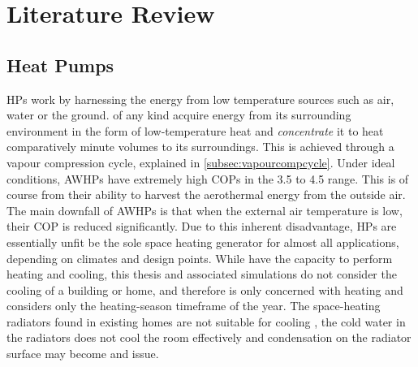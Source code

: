 \chapter{Literature Review}\label{ch:litreview}



\section{Heat Pumps} \label{sec:heatpumps}
\acp{HP} work by harnessing the energy from low temperature sources such as air, water or the ground. \HPs of any kind acquire energy from its surrounding environment in the form of low-temperature heat and \textit{concentrate} it to heat comparatively minute volumes to its surroundings. This is achieved through a vapour compression cycle, explained in \cref{subsec:vapourcompcycle}. Under ideal conditions, \acp{AWHP} have extremely high \acp{COP} in the \num{3.5} to \num{4.5} range. This is of course from their ability to harvest the aerothermal energy from the outside air. The main downfall of \acp{AWHP} is that when the external air temperature is low, their \ac{COP} is reduced significantly. Due to this inherent disadvantage, \acp{HP} are essentially unfit be the sole space heating generator for almost all applications, depending on climates and design points. While \HPs have the capacity to perform heating and cooling, this thesis and associated simulations do not consider the cooling of a building or home, and therefore is only concerned with heating and considers only the heating-season timeframe of the year. The space-heating radiators found in existing homes are not suitable for cooling \cite{klein_numerical_2014}, the cold water in the radiators does not cool the room effectively and condensation on the radiator surface may become and issue. 

